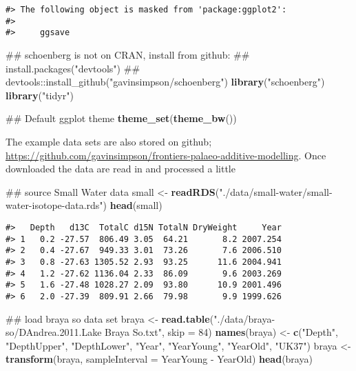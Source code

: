 \documentclass[12pt,]{article}
\newenvironment{Shaded}{\begin{snugshade}}{\end{snugshade}}
\newcommand{\KeywordTok}[1]{\textcolor[rgb]{0.13,0.29,0.53}{\textbf{{#1}}}}
\newcommand{\DataTypeTok}[1]{\textcolor[rgb]{0.13,0.29,0.53}{{#1}}}
\newcommand{\DecValTok}[1]{\textcolor[rgb]{0.00,0.00,0.81}{{#1}}}
\newcommand{\StringTok}[1]{\textcolor[rgb]{0.31,0.60,0.02}{{#1}}}
\newcommand{\NormalTok}[1]{{#1}}
\begin{document}
\begin{verbatim}
#> The following object is masked from 'package:ggplot2':
#> 
#>     ggsave
\end{verbatim}

\begin{Shaded}
\begin{Highlighting}[]
\NormalTok{## schoenberg is not on CRAN, install from github:}
\NormalTok{## install.packages("devtools")}
\NormalTok{## devtools::install_github("gavinsimpson/schoenberg")}
\KeywordTok{library}\NormalTok{(}\StringTok{"schoenberg"}\NormalTok{)}
\KeywordTok{library}\NormalTok{(}\StringTok{"tidyr"}\NormalTok{)}

\NormalTok{## Default ggplot theme}
\KeywordTok{theme_set}\NormalTok{(}\KeywordTok{theme_bw}\NormalTok{())}
\end{Highlighting}
\end{Shaded}

The example data sets are also stored on github;
\url{https://github.com/gavinsimpson/frontiers-palaeo-additive-modelling}.
Once downloaded the data are read in and processed a little

\begin{Shaded}
\begin{Highlighting}[]
\NormalTok{## source Small Water data}
\NormalTok{small <-}\StringTok{ }\KeywordTok{readRDS}\NormalTok{(}\StringTok{"./data/small-water/small-water-isotope-data.rds"}\NormalTok{)}
\KeywordTok{head}\NormalTok{(small)}
\end{Highlighting}
\end{Shaded}

\begin{verbatim}
#>   Depth   d13C  TotalC d15N TotalN DryWeight     Year
#> 1   0.2 -27.57  806.49 3.05  64.21       8.2 2007.254
#> 2   0.4 -27.67  949.33 3.01  73.26       7.6 2006.510
#> 3   0.8 -27.63 1305.52 2.93  93.25      11.6 2004.941
#> 4   1.2 -27.62 1136.04 2.33  86.09       9.6 2003.269
#> 5   1.6 -27.48 1028.27 2.09  93.80      10.9 2001.496
#> 6   2.0 -27.39  809.91 2.66  79.98       9.9 1999.626
\end{verbatim}

\begin{Shaded}
\begin{Highlighting}[]
\NormalTok{## load braya so data set}
\NormalTok{braya <-}\StringTok{ }\KeywordTok{read.table}\NormalTok{(}\StringTok{"./data/braya-so/DAndrea.2011.Lake Braya So.txt"}\NormalTok{,}
                    \DataTypeTok{skip =} \DecValTok{84}\NormalTok{)}
\KeywordTok{names}\NormalTok{(braya) <-}\StringTok{ }\KeywordTok{c}\NormalTok{(}\StringTok{"Depth"}\NormalTok{, }\StringTok{"DepthUpper"}\NormalTok{, }\StringTok{"DepthLower"}\NormalTok{, }\StringTok{"Year"}\NormalTok{, }\StringTok{"YearYoung"}\NormalTok{,}
                  \StringTok{"YearOld"}\NormalTok{, }\StringTok{"UK37"}\NormalTok{)}
\NormalTok{braya <-}\StringTok{ }\KeywordTok{transform}\NormalTok{(braya, }\DataTypeTok{sampleInterval =} \NormalTok{YearYoung -}\StringTok{ }\NormalTok{YearOld)}
\KeywordTok{head}\NormalTok{(braya)}
\end{Highlighting}
\end{Shaded}
\end{document}
